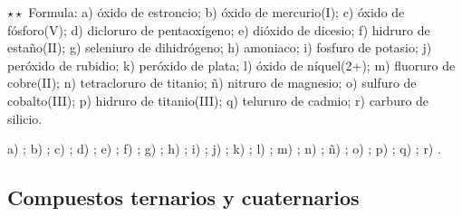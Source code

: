 \begin{exercise}
    \(\star\star\) Formula: a) óxido de estroncio; b) óxido de mercurio(I); c) óxido de fósforo(V); d) dicloruro de
    pentaoxígeno; e) dióxido de dicesio; f) hidruro de estaño(II); g) seleniuro de dihidrógeno; h) amoniaco; i) fosfuro de
    potasio; j) peróxido de rubidio; k) peróxido de plata; l) óxido de níquel(2+); m) fluoruro de cobre(II); n) tetracloruro de
    titanio; ñ) nitruro de magnesio; o) sulfuro de cobalto(III); p) hidruro de titanio(III); q) telururo de cadmio; r) carburo
    de silicio.
    \begin{solu}
        a) \textcolor{red}{}; b) \textcolor{red}{}; c) \textcolor{red}{}; d) \textcolor{red}{};
        e) \textcolor{red}{}; f) \textcolor{red}{}; g) \textcolor{red}{}; h) \textcolor{red}{};
        i) \textcolor{red}{}; j) \textcolor{red}{}; k) \textcolor{red}{}; l) \textcolor{red}{};
        m) \textcolor{red}{}; n) \textcolor{red}{}; ñ) \textcolor{red}{}; o)
        \textcolor{red}{}; p) \textcolor{red}{}; q) \textcolor{red}{}; r) \textcolor{red}{}.
    \end{solu}
\end{exercise}

\subsection{Compuestos ternarios y cuaternarios}

